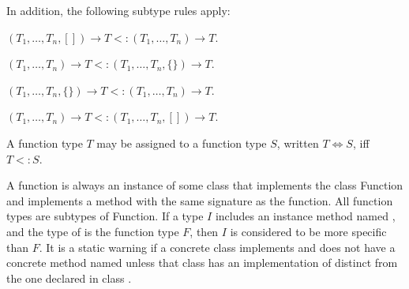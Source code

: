 \documentclass{article}
\newcommand{\code}[1]{{\sf #1}}
\begin{document}




\LMHash{}
In addition, the following subtype rules apply:


$(T_1, \ldots, T_n, []) \rightarrow T <: (T_1, \ldots, T_n) \rightarrow T$.

$(T_1, \ldots, T_n) \rightarrow T <: (T_1, \ldots, T_n, \{\}) \rightarrow T$.

$(T_1, \ldots, T_n, \{\}) \rightarrow T <: (T_1, \ldots, T_n) \rightarrow T$.

$(T_1, \ldots, T_n) \rightarrow T <: (T_1, \ldots, T_n, []) \rightarrow T$.


\LMHash{}
A function type $T$ may be assigned to a function type $S$, written  $T \Longleftrightarrow S$, iff  $T <: S$.

\LMHash{}
A function is always an instance of some class that implements the class \code{Function} and implements a \CALL{} method with the same signature as the function. All function types are subtypes of \code{Function}.
If a type $I$ includes an instance method named \CALL{}, and the type of \CALL{} is the function type $F$, then $I$ is considered to be more specific than $F$.  It is a static warning if a concrete class implements  and does not have a concrete method named \CALL{} unless that class has an implementation of  distinct from the one declared in class .
\end{document}
